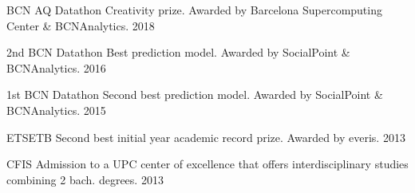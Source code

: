 
\begin{cvhonors}

  \cvhonor
    {BCN AQ Datathon}
    {Creativity prize. Awarded by Barcelona Supercomputing Center \& BCNAnalytics.}
    {}
    {2018}

  \cvhonor
    {2nd BCN Datathon}
    {Best prediction model. Awarded by SocialPoint \& BCNAnalytics.}
    {}
    {2016}

  \cvhonor
    {1st BCN Datathon}
    {Second best prediction model. Awarded by SocialPoint \& BCNAnalytics.}
    {}
    {2015}

  \cvhonor
    {ETSETB}
    {Second best initial year academic record prize. Awarded by everis.}
    {}
    {2013}

  \cvhonor
    {CFIS}
    {Admission to a UPC center of excellence that offers interdisciplinary studies combining 2 bach. degrees.}
    {}
    {2013}

\end{cvhonors}
